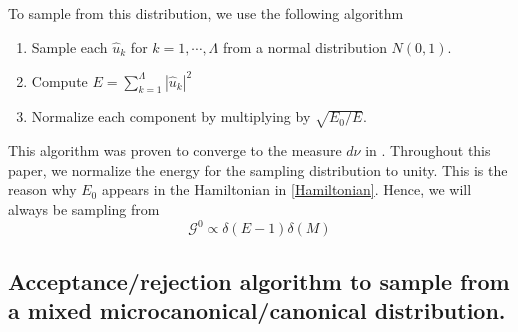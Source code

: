 \documentclass[12pt]{article}
\newcommand{\abs}[1]{\left| #1 \right|}
\newcommand{\uhat}{\hat{u}}
\newcommand{\sumk}{\sum_{k=1}^{\Lambda}}
\newcommand{\Gibbs}{\mathcal{G}}
\begin{document}
To sample from this distribution, we use the following algorithm
\begin{enumerate}
\item Sample each $\uhat_k$ for $k=1,\cdots,\Lambda$ from a normal distribution $N(0,1)$.
\item Compute $E = \sumk \abs{\uhat_k}^2$
\item Normalize each component by multiplying by $\sqrt{E_0/E}$.
\end{enumerate}
This algorithm was proven to converge to the measure $d\nu$ in \cite{abramov2003hamiltonian}. Throughout this paper, we normalize the energy for the sampling distribution to unity. This is the reason why $E_0$ appears in the Hamiltonian in \eqref{Hamiltonian}. Hence, we will always be sampling from
\begin{equation}
\Gibbs^0 \propto \delta(E-1) \delta(M)
\end{equation}

\subsection{Acceptance/rejection algorithm to sample from a mixed microcanonical/canonical distribution.}
\label{sec_accrej}
\end{document}
